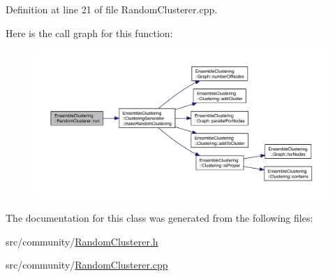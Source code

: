 Definition at line 21 of file Random\-Clusterer.\-cpp.



Here is the call graph for this function\-:
\nopagebreak
\begin{figure}[H]
\begin{center}
\leavevmode
\includegraphics[width=350pt]{class_ensemble_clustering_1_1_random_clusterer_ae10f83a508ceaac1b61cd6e7029bded1_cgraph}
\end{center}
\end{figure}




The documentation for this class was generated from the following files\-:\begin{DoxyCompactItemize}
\item 
src/community/\hyperlink{_random_clusterer_8h}{Random\-Clusterer.\-h}\item 
src/community/\hyperlink{_random_clusterer_8cpp}{Random\-Clusterer.\-cpp}\end{DoxyCompactItemize}
